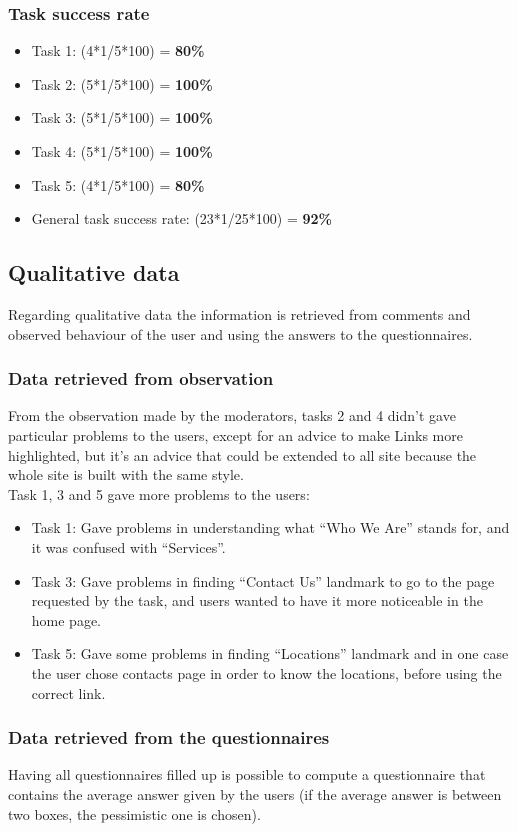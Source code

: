 \subsubsection{Task success rate}
\begin{itemize}
\item Task 1: (4*1/5*100) = \textbf{80\%}
\item Task 2: (5*1/5*100) = \textbf{100\%}
\item Task 3: (5*1/5*100) = \textbf{100\%}
\item Task 4: (5*1/5*100) = \textbf{100\%}
\item Task 5: (4*1/5*100) = \textbf{80\%}
\item General task success rate: (23*1/25*100) = \textbf{92\%}
\end{itemize}

\subsection{Qualitative data}
Regarding qualitative data the information is retrieved from comments and observed behaviour of the user and using the answers to the questionnaires.

\subsubsection{Data retrieved from observation}
From the observation made by the moderators, tasks 2 and 4 didn't gave particular problems to the users, except for an advice to make Links more highlighted, but it's an advice that could be extended to all site because the whole site is built with the same style.\\
Task 1, 3 and 5 gave more problems to the users:
\begin{itemize}
\item Task 1: Gave problems in understanding what ``Who We Are'' stands for, and it was confused with ``Services''.
\item Task 3: Gave problems in finding ``Contact Us'' landmark to go to the page requested by the task, and users wanted to have it more noticeable in the home page.
\item Task 5: Gave some problems in finding ``Locations'' landmark and in one case the user chose contacts page in order to know the locations, before using the correct link.
\end{itemize}

\subsubsection{Data retrieved from the questionnaires}
Having all questionnaires filled up is possible to compute a questionnaire that contains the average answer given by the users (if the average answer is between two boxes, the pessimistic one is chosen).


